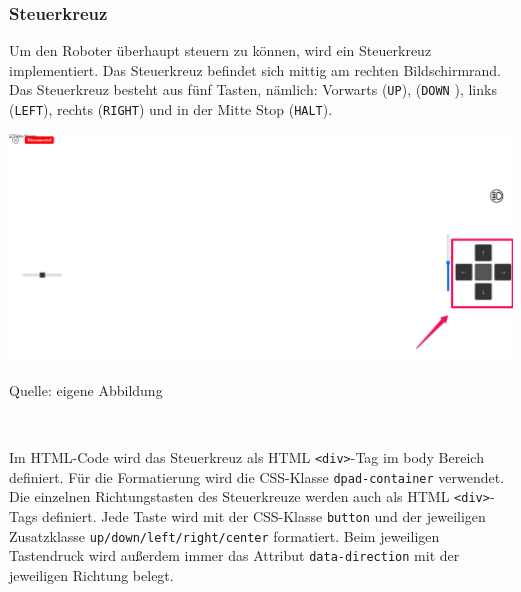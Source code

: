 \documentclass[ngerman,12pt,a4paper]{article}
\begin{document}
			\subsubsection*{Steuerkreuz}
				
	Um den Roboter überhaupt steuern zu können, wird ein Steuerkreuz implementiert. Das Steuerkreuz befindet sich mittig am rechten Bildschirmrand. Das Steuerkreuz besteht aus fünf Tasten, nämlich: Vorwarts (\texttt{UP}), (\texttt{DOWN} ), links (\texttt{LEFT}), rechts (\texttt{RIGHT}) und in der Mitte Stop (\texttt{HALT}). \\[0.5cm]
	\begin{center}
		\begin{minipage}[t]{1\textwidth}
			\includegraphics[scale=0.4]{Pictures/Steuerung-web}
			\label{fig:Steuerkreuz-web}
			\vspace{-10pt}
			\begin{center}
				\par\small Quelle: eigene Abbildung 
			\end{center}
		\end{minipage} \\[0.75cm]
	\end{center}
	Im HTML-Code wird das Steuerkreuz als HTML \texttt{<div>}-Tag im body Bereich definiert. Für die Formatierung wird die CSS-Klasse \texttt{dpad-container} verwendet. Die einzelnen Richtungstasten des Steuerkreuze werden auch als HTML \texttt{<div>}-Tags definiert. Jede Taste wird mit der CSS-Klasse \texttt{button} und der jeweiligen Zusatzklasse \texttt{up/down/left/right/center} formatiert. Beim jeweiligen Tastendruck wird außerdem immer das Attribut \texttt{data-direction} mit der jeweiligen Richtung belegt.
\end{document}
